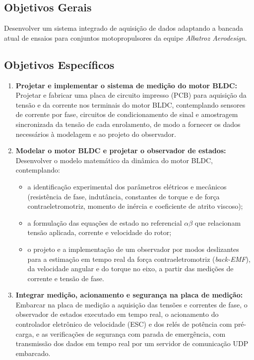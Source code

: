 \subsection{Objetivos Gerais}

Desenvolver um sistema integrado de aquisição de dados adaptando a bancada atual de ensaios para conjuntos motopropulsores da equipe \textit{Albatroz Aerodesign}.

\subsection{Objetivos Específicos}
\begin{enumerate}
    \item \textbf{Projetar e implementar o sistema de medição do motor BLDC:}
    Projetar e fabricar uma placa de circuito impresso (PCB) para aquisição da
    tensão e da corrente nos terminais do motor BLDC, contemplando sensores de
    corrente por fase, circuitos de condicionamento de sinal e amostragem
    sincronizada da tensão de cada enrolamento, de modo a fornecer os dados
    necessários à modelagem e ao projeto do observador.

    \item \textbf{Modelar o motor BLDC e projetar o observador de estados:}
    Desenvolver o modelo matemático da dinâmica do motor BLDC, contemplando:
    \begin{itemize}
        \item a identificação experimental dos parâmetros elétricos e mecânicos
        (resistência de fase, indutância, constantes de torque e de força
        contraeletromotriz, momento de inércia e coeficiente de atrito viscoso);
        \item a formulação das equações de estado no referencial $\alpha\beta$
        que relacionam tensão aplicada, corrente e velocidade do rotor;
        \item o projeto e a implementação de um observador por modos deslizantes
        para a estimação em tempo real da força contraeletromotriz
        (\textit{back-EMF}), da velocidade angular e do torque no eixo, a partir
        das medições de corrente e tensão de fase.
    \end{itemize}

    \item \textbf{Integrar medição, acionamento e segurança na placa de
    medição:} Embarcar na placa de medição a aquisição das tensões e correntes
    de fase, o observador de estados executado em tempo real, o acionamento do
    controlador eletrônico de velocidade (ESC) e dos relés de potência com
    pré-carga, e as verificações de segurança com parada de emergência, com
    transmissão dos dados em tempo real por um servidor de comunicação UDP
    embarcado.


\end{enumerate}
